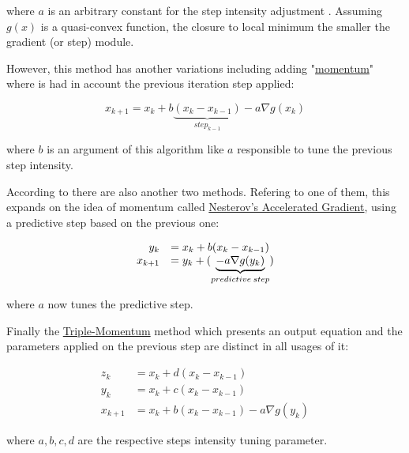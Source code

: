 where \(a\) is an arbitrary constant for the step intensity adjustment . Assuming \(g(x)\) is a quasi-convex function, the closure to local minimum the smaller the gradient (or step) module. \par

However, this method has another variations including adding "\underline{momentum}" where is had in account the previous iteration step applied:

\begin{equation}
    x_{k+1} = x_k + b \underbrace{(x_k - x_{k-1})}_{step_{k-1}} - a \nabla g(x_k)
    \label{eq_Gradient_Descent_Momentum}
\end{equation}

where \(b\) is an argument of this algorithm like \(a\) responsible to tune the previous step intensity. \par
According to \cite{hao2025analysis} there are also another two methods. Refering to one of them, this expands on the idea of momentum called \underline{Nesterov's Accelerated Gradient}, using a predictive step based on the previous one: 

\begin{equation}
    \begin{array}{rl}
      y_k &=  x_k + b (x_k - x_{k-1})  \\
      x_{k+1} &= y_k + (\underbrace{- a \nabla g(y_k)}_{predictive  \hspace{0.2em}step})
    \end{array}
    \label{eq_Gradient_Descent_Nesterov}
\end{equation}

where \(a\) now tunes the predictive step. \par

Finally the \underline{Triple-Momentum} method which presents an output equation and the parameters applied on the previous step are distinct in all usages of it:

\begin{equation}
    \begin{array}{rl}
      z_k &= x_k + d (x_k - x_{k-1}) \\
      y_k &=  x_k + c (x_k - x_{k-1})  \\
      x_{k+1} &= x_k + b(x_k - x_{k-1}) - a \nabla g(y_k)
    \end{array}
    \label{eq_Gradient_Descent_Nesterov}
\end{equation}

where \(a, b, c, d\) are the respective steps intensity tuning parameter. \\

